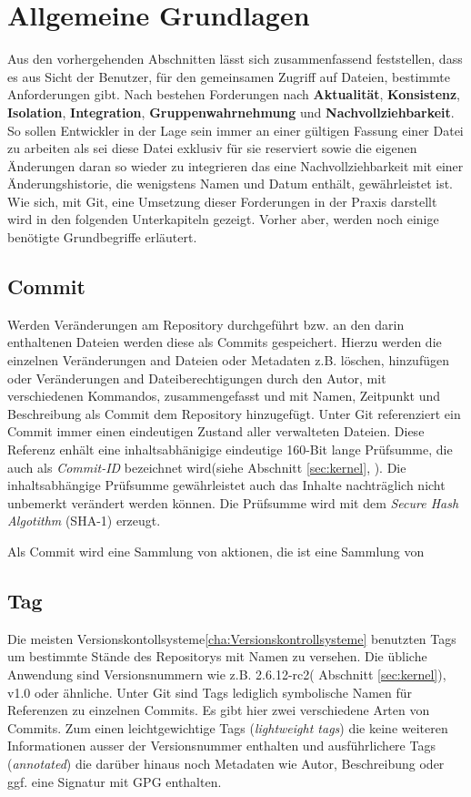 \section{Allgemeine Grundlagen}\label{sec:Grundlagen}
Aus den vorhergehenden Abschnitten lässt sich zusammenfassend feststellen, dass
es aus Sicht der Benutzer, für den gemeinsamen Zugriff auf Dateien, bestimmte
Anforderungen gibt. Nach \cite[S.~37]{hagen:1678} bestehen Forderungen nach
\textbf{Aktualität}, \textbf{Konsistenz}, \textbf{Isolation},
\textbf{Integration}, \textbf{Gruppenwahrnehmung} und
\textbf{Nachvollziehbarkeit}. So sollen Entwickler in der Lage sein immer an
einer gültigen Fassung einer Datei zu arbeiten als sei diese Datei exklusiv für
sie reserviert sowie die eigenen Änderungen daran so wieder zu integrieren das
eine Nachvollziehbarkeit mit einer Änderungshistorie, die wenigstens Namen und
Datum enthält, gewährleistet ist. Wie sich, mit Git, eine Umsetzung dieser
Forderungen in der Praxis darstellt wird in den folgenden Unterkapiteln
gezeigt. Vorher aber, werden noch einige benötigte Grundbegriffe erläutert.

\subsection{Commit}\label{sec:commit}
Werden Veränderungen am Repository durchgeführt bzw. an den darin enthaltenen
Dateien werden diese als Commits gespeichert. Hierzu werden die einzelnen
Veränderungen and Dateien oder Metadaten z.B. löschen, hinzufügen oder
Veränderungen and Dateiberechtigungen durch den Autor, mit verschiedenen
Kommandos, zusammengefasst und mit Namen, Zeitpunkt und Beschreibung als Commit
dem Repository hinzugefügt. Unter Git referenziert ein Commit immer einen
eindeutigen Zustand aller verwalteten Dateien. Diese Referenz enhält eine
inhaltsabhänigige eindeutige 160-Bit lange Prüfsumme, die auch als
\textit{Commit-ID} bezeichnet wird(siehe Abschnitt \ref{sec:kernel},
\pageref{sec:kernel}). Die inhaltsabhängige Prüfsumme gewährleistet auch das
Inhalte nachträglich nicht unbemerkt verändert werden können. Die Prüfsumme
wird mit dem \textit{Secure Hash Algotithm} (SHA-1) erzeugt.

Als Commit wird eine Sammlung von aktionen, die ist eine Sammlung von
\subsection{Tag}\label{sec:tag}
Die meisten Versionskontollsysteme\ref{cha:Versionskontrollsysteme} benutzten
Tags um bestimmte Stände des Repositorys mit Namen zu versehen. Die übliche
Anwendung sind Versionsnummern wie z.B. 2.6.12-rc2( Abschnitt
\ref{sec:kernel}), v1.0 oder ähnliche. Unter Git sind Tags
lediglich symbolische Namen für Referenzen zu einzelnen Commits. Es gibt hier
zwei verschiedene Arten von Commits. Zum einen leichtgewichtige Tags
(\textit{lightweight tags}) die keine weiteren Informationen ausser der
Versionsnummer enthalten und ausführlichere Tags (\textit{annotated}) die
darüber hinaus noch Metadaten wie Autor, Beschreibung oder ggf. eine Signatur
mit GPG enthalten.\cite[S.~48]{progit}

